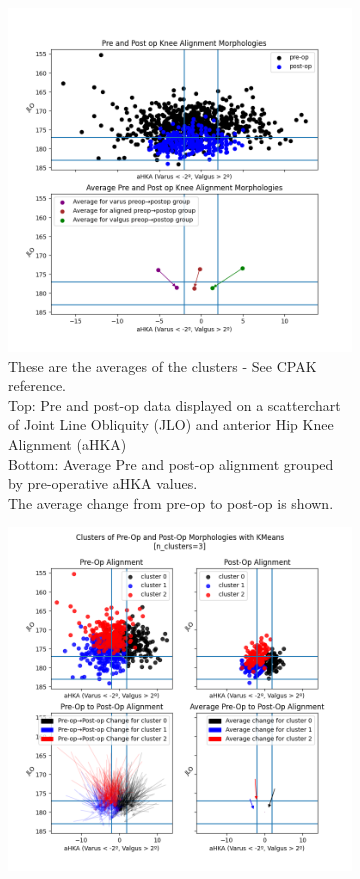 \documentclass{article}
\begin{document}
\begin{figure}[ht]
	\caption{Data Visualization and Clustering}
	\begin{subfigure}[lt]{.4\textwidth}
		\includegraphics[width=\linewidth]{data_vis.png}
		\caption{%
			\footnotesize
			These are the averages of the clusters - See CPAK reference.\\
			Top: Pre and post-op data displayed on a scatterchart of Joint Line Obliquity (JLO) and anterior Hip Knee Alignment (aHKA)\\
			Bottom: Average Pre and post-op alignment grouped by pre-operative aHKA values.\\
			The average change from pre-op to post-op is shown.
			}
		\label{fig:cpak_ref}
	\end{subfigure}
	\begin{subfigure}[rt]{.58\textwidth}
		\includegraphics[width=\linewidth]{clusters.png}

\end{subfigure}
\end{figure}
\end{document}
